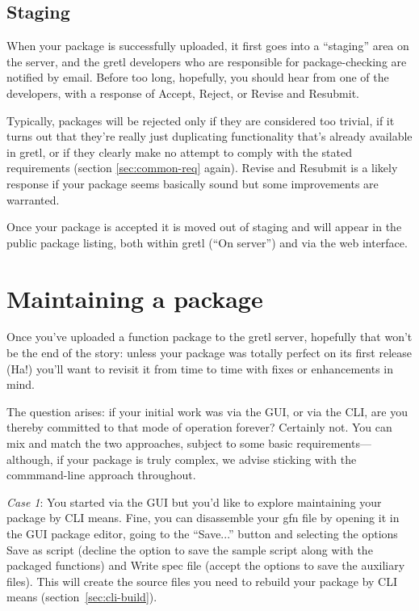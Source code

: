 \documentclass[oneside]{book}
\begin{document}
\subsection{Staging}

When your package is successfully uploaded, it first goes into a
``staging'' area on the server, and the gretl developers who are
responsible for package-checking are notified by email. Before too
long, hopefully, you should hear from one of the developers, with a
response of Accept, Reject, or Revise and Resubmit.

Typically, packages will be rejected only if they are considered too
trivial, if it turns out that they're really just duplicating
functionality that's already available in gretl, or if they clearly
make no attempt to comply with the stated requirements (section
\ref{sec:common-req} again). Revise and Resubmit is a likely response
if your package seems basically sound but some improvements are
warranted.

Once your package is accepted it is moved out of staging and will
appear in the public package listing, both within gretl (``On
server'') and via the web interface.


\section{Maintaining a package}
\label{sec:maint}

Once you've uploaded a function package to the gretl server, hopefully
that won't be the end of the story: unless your package was totally
perfect on its first release (Ha!) you'll want to revisit it from time
to time with fixes or enhancements in mind.

The question arises: if your initial work was via the GUI, or via the
CLI, are you thereby committed to that mode of operation forever?
Certainly not. You can mix and match the two approaches, subject to
some basic requirements---although, if your package is truly complex,
we advise sticking with the commmand-line approach throughout.

\textit{Case 1}: You started via the GUI but you'd like to explore
maintaining your package by CLI means. Fine, you can disassemble your
\textsf{gfn} file by opening it in the GUI package editor, going to
the ``\textsf{Save...}'' button and selecting the options \textsf{Save
  as script} (decline the option to save the sample script along with
the packaged functions) and \textsf{Write spec file} (accept the
options to save the auxiliary files). This will create the source
files you need to rebuild your package by CLI means
(section~\ref{sec:cli-build}).
\end{document}

